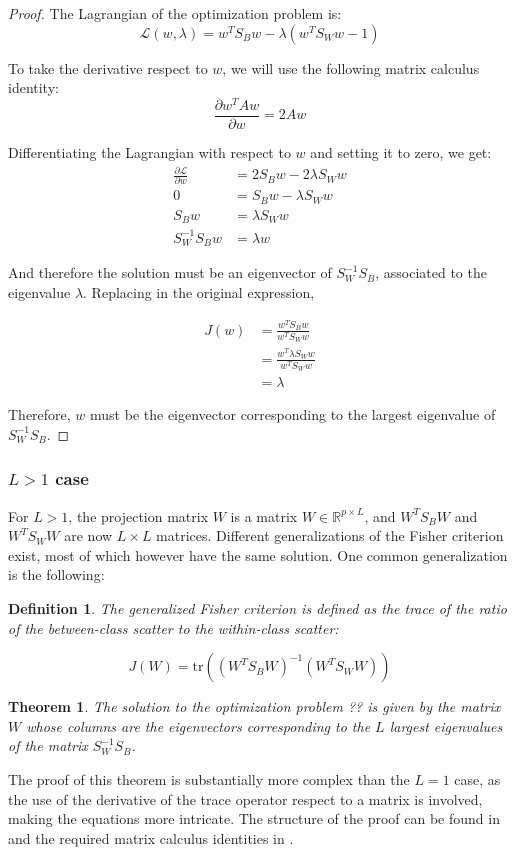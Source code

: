 \documentclass[a4paper,12pt]{article}
\newtheorem{theorem}{Theorem}
\newtheorem{definition}{Definition}
\begin{document}
\begin{proof}
The Lagrangian of the optimization problem is:
\[
\mathcal{L}(w, \lambda) = w^T S_B w - \lambda(w^T S_W w - 1)
\]

To take the derivative respect to $w$, we will use the following matrix calculus identity:
\[
\frac{\partial w^T A w}{\partial w} = 2Aw
\]

Differentiating the Lagrangian with respect to $w$ and setting it to zero, we get:
\begin{align*}
\frac{\partial \mathcal{L}}{\partial w} &= 2S_B w - 2\lambda S_W w \\
0 &= S_B w - \lambda S_W w \\
S_B w &= \lambda S_W w \\
S_W^{-1} S_B w &= \lambda w
\end{align*}

And therefore the solution must be an eigenvector of $S_W^{-1} S_B$, associated to the eigenvalue $\lambda$. Replacing in the original expression,

\begin{align*}
J(w) &= \frac{w^T S_B w}{w^T S_W w} \\
&= \frac{w^T \lambda S_W w}{w^T S_W w} \\
& = \lambda
\end{align*}

Therefore, $w$ must be the eigenvector corresponding to the largest eigenvalue of $S_W^{-1} S_B$.

\end{proof}

\subsubsection{$L>1$ case}
For $L>1$, the projection matrix $W$ is a matrix $W \in \mathbb{R}^{p \times L}$, and $W^T S_B W$ and $W^T S_W W$ are now $L \times L$ matrices. Different generalizations of the Fisher criterion exist, most of which however have the same solution. One common generalization is the following:

\begin{definition}
The generalized Fisher criterion is defined as the trace of the ratio of the between-class scatter to the within-class scatter:

\[
J(W) = \text{tr}((W^T S_B W)^{-1} (W^T S_W W))
\]
\end{definition}

\begin{theorem}
The solution to the optimization problem ?? is given by the matrix $W$ whose columns are the eigenvectors corresponding to the $L$ largest eigenvalues of the matrix $S_W^{-1} S_B$.
\end{theorem}

The proof of this theorem is substantially more complex than the $L=1$ case, as the use of the derivative of the trace operator respect to a matrix is involved, making the equations more intricate. The structure of the proof can be found in \cite{fisher1936} and the required matrix calculus identities in \cite{matrix-calc}.
\end{document}
